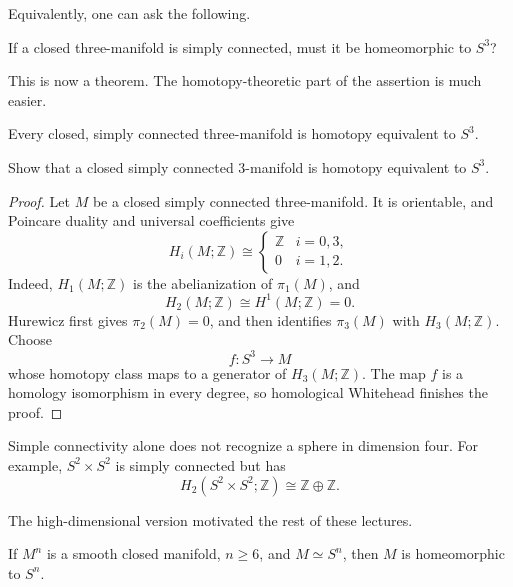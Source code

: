Equivalently, one can ask the following.

\begin{remark}
\label{at-question-poincare-simply-connected}
If a closed three-manifold is simply
connected, must it be homeomorphic to $S^3$?
\end{remark}

This is now a theorem.  The
homotopy-theoretic
part of the assertion is much easier.

\begin{proposition}
\label{at-proposition-three-manifold-sphere}
Every closed, simply connected
three-manifold is homotopy equivalent to
$S^3$.
\end{proposition}

\begin{exercise}
Show that a closed simply connected
$3$-manifold is homotopy equivalent to
$S^3$.
\end{exercise}

\begin{proof}
Let $M$ be a closed simply connected
three-manifold.  It is orientable, and
Poincare duality and universal coefficients
give
$$
H_i(M;\mathbb{Z})\cong
\begin{cases}
\mathbb{Z}&i=0,3,\\
0&i=1,2.
\end{cases}
$$
Indeed, $H_1(M;\mathbb{Z})$ is the
abelianization of $\pi_1(M)$, and
$$
H_2(M;\mathbb{Z})
\cong H^1(M;\mathbb{Z})=0.
$$
Hurewicz first gives $\pi_2(M)=0$, and then
identifies $\pi_3(M)$ with
$H_3(M;\mathbb{Z})$.  Choose
$$
f:S^3\longrightarrow M
$$
whose homotopy class maps to a generator of
$H_3(M;\mathbb{Z})$.  The map $f$ is a
homology isomorphism in every degree, so
homological Whitehead finishes the proof.
\end{proof}

\begin{remark}
\label{at-remark-four-manifold-example}
Simple connectivity alone does not recognize
a sphere in dimension four.  For example,
$S^2\times S^2$ is simply connected but has
$$
H_2(S^2\times S^2;\mathbb{Z})
\cong\mathbb{Z}\oplus\mathbb{Z}.
$$
\end{remark}

The high-dimensional version motivated the
rest of these lectures.

\begin{theorem}[Smale]
\label{at-theorem-smale-poincare}
If $M^n$ is a smooth closed manifold,
$n\geq6$, and $M\simeq S^n$, then $M$ is
homeomorphic to $S^n$.
\end{theorem}

